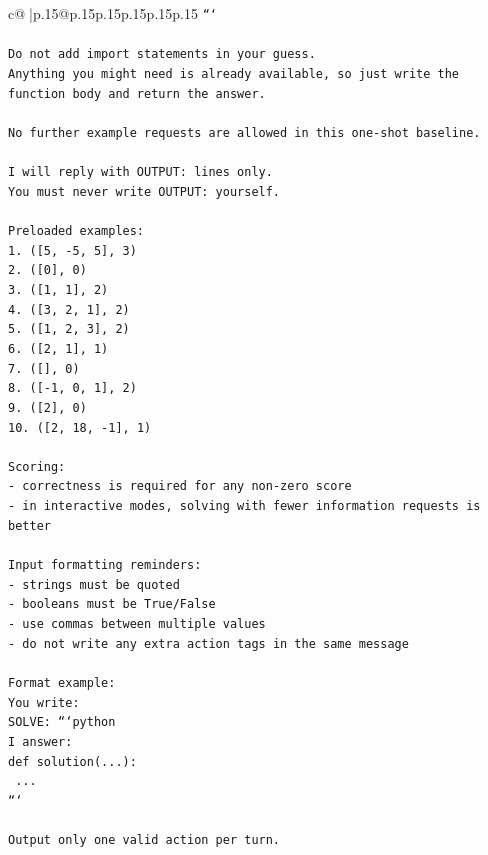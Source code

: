 \documentclass{article}
\begin{document}
{\begin{supertabular}{c@{$\;$}|p{.15\linewidth}@{}p{.15\linewidth}p{.15\linewidth}p{.15\linewidth}p{.15\linewidth}p{.15\linewidth}}
{{{\texttt{```} \\
\\ 
\texttt{Do not add import statements in your guess.} \\
\texttt{Anything you might need is already available, so just write the function body and return the answer.} \\
\\ 
\texttt{No further example requests are allowed in this one{-}shot baseline.} \\
\\ 
\texttt{I will reply with OUTPUT: lines only.} \\
\texttt{You must never write OUTPUT: yourself.} \\
\\ 
\texttt{Preloaded examples:} \\
\texttt{1. ({[}5, {-}5, 5{]}, 3)} \\
\texttt{2. ({[}0{]}, 0)} \\
\texttt{3. ({[}1, 1{]}, 2)} \\
\texttt{4. ({[}3, 2, 1{]}, 2)} \\
\texttt{5. ({[}1, 2, 3{]}, 2)} \\
\texttt{6. ({[}2, 1{]}, 1)} \\
\texttt{7. ({[}{]}, 0)} \\
\texttt{8. ({[}{-}1, 0, 1{]}, 2)} \\
\texttt{9. ({[}2{]}, 0)} \\
\texttt{10. ({[}2, 18, {-}1{]}, 1)} \\
\\ 
\texttt{Scoring:} \\
\texttt{{-} correctness is required for any non{-}zero score} \\
\texttt{{-} in interactive modes, solving with fewer information requests is better} \\
\\ 
\texttt{Input formatting reminders:} \\
\texttt{{-} strings must be quoted} \\
\texttt{{-} booleans must be True/False} \\
\texttt{{-} use commas between multiple values} \\
\texttt{{-} do not write any extra action tags in the same message} \\
\\ 
\texttt{Format example:} \\
\texttt{You write:} \\
\texttt{SOLVE: ```python} \\
\texttt{I answer:} \\
\texttt{def solution(...):} \\
\texttt{    ...} \\
\texttt{```} \\
\\ 
\texttt{Output only one valid action per turn.} \\
            }
        }
    }
     \\ \\


\end{supertabular}}
\end{document}
